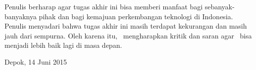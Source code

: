 Penulis berharap agar tugas akhir ini bisa memberi manfaat bagi sebanyak-banyaknya pihak dan bagi kemajuan perkembangan teknologi di Indonesia. Penulis menyadari bahwa tugas akhir ini masih terdapat kekurangan dan masih jauh dari sempurna. Oleh karena itu, \saya~mengharapkan kritik dan saran agar \saya~bisa menjadi lebih baik lagi di masa depan.

\vspace*{0.1cm}
\begin{flushright}
Depok, 14 Juni 2015\\[0.1cm]
\vspace*{1cm}
\penulis

\end{flushright}